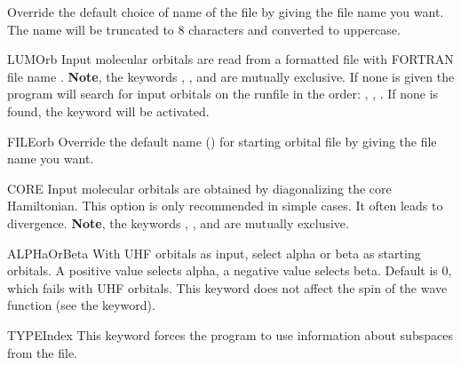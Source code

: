 \begin{keywordlist}
Override the default choice of name of the  file by giving the file name you want.
The name will be truncated to 8 characters and converted to uppercase.
\item[LUMOrb]
Input molecular orbitals are read from a formatted file with
FORTRAN file name .
{\bf Note}, the keywords , , and
 are mutually exclusive. If none is given the program will
search for input orbitals on the runfile in the order: ,
, . If none is found, the keyword 
will be activated.
\item[FILEorb]
Override the default name () for starting orbital file by giving the file name you want.
\item[CORE]
Input molecular orbitals are obtained by diagonalizing the core Hamiltonian.
This option is only recommended in simple cases. It often leads to divergence.
{\bf Note}, the keywords , , and
 are mutually exclusive.
\item[ALPHaOrBeta]
With UHF orbitals as input, select alpha or beta as starting orbitals. A positive value selects alpha,
a negative value selects beta. Default is 0, which fails with UHF orbitals. This keyword does not
affect the spin of the wave function (see the  keyword).
\item[TYPEIndex]
This keyword forces the program to use information about subspaces from the
 file.


\end{keywordlist}
